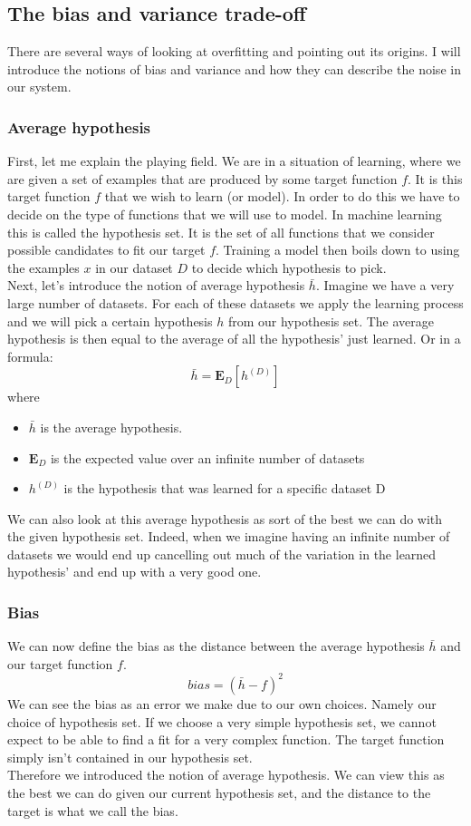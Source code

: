 \subsection{The bias and variance trade-off}
There are several ways of looking at overfitting and pointing out its origins. I will introduce the notions of bias and variance and how they can describe the noise in our system. \\
\subsubsection{Average hypothesis}
First, let me explain the playing field. We are in a situation of learning, where we are given a set of examples that are produced by some target function $f$. It is this target function $f$ that we wish to learn (or model). In order to do this we have to decide on the type of functions that we will use to model. In machine learning this is called the hypothesis set. It is the set of all functions that we consider possible candidates to fit our target $f$. Training a model then boils down to using the examples $x$ in our dataset $D$ to decide which hypothesis to pick. \\
Next, let's introduce the notion of average hypothesis $\bar{h}$. Imagine we have a very large number of datasets. For each of these datasets we apply the learning process and we will pick a certain hypothesis $h$ from our hypothesis set. The average hypothesis is then equal to the average of all the hypothesis' just learned. Or in a formula:
$$
\bar{h} = \mathbf{E}_{D}[h^{(D)}]
$$
where
\begin{itemize}
	\item $\bar{h}$ is the average hypothesis.
	\item $\mathbf{E}_{D}$ is the expected value over an infinite number of datasets
	\item $h^{(D)}$ is the hypothesis that was learned for a specific dataset D
\end{itemize}
We can also look at this average hypothesis as sort of the best we can do with the given hypothesis set. Indeed, when we imagine having an infinite number of datasets we would end up cancelling out much of the variation in the learned hypothesis' and end up with a very good one. \\
\subsubsection{Bias}
We can now define the bias\cite{caltechmachinelearning} as the distance between the average hypothesis $\bar{h}$ and our target function $f$.
$$
bias = (\bar{h} - f)^{2}
$$
We can see the bias as an error we make due to our own choices. Namely our choice of hypothesis set. If we choose a very simple hypothesis set, we cannot expect to be able to find a fit for a very complex function. The target function simply isn't contained in our hypothesis set. \\
Therefore we introduced the notion of average hypothesis. We can view this as the best we can do given our current hypothesis set, and the distance to the target is what we call the bias.
